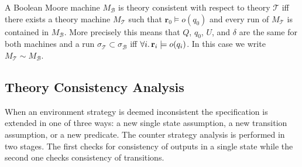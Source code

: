 \documentclass[runningheads]{llncs}
\newcommand{\globally}{\operatorname{\mathbf{G}}}
\newcommand{\lnext}{\operatorname{\mathbf{X}}}
\newcommand{\theory}{\mathcal{T}}
\newcommand{\bool}{\mathcal{B}}
\newcommand{\updf}{\mathbf{u}}
\newcommand{\rvar}{\mathbf{r}}
\newcommand{\ivar}{\mathbf{i}}
\newcommand{\sat}[1]{\texttt{sat}(#1)}
\newcommand{\consistent}{\textsc{consistent}}
\newcommand{\inconsistent}{\textsc{inconsistent}}
\begin{document}
A Boolean Moore machine $M_\bool$ is theory consistent with respect to theory $\theory$ iff there exists a theory machine $M_\theory$ such that $\rvar_0 \models o(q_0)$ and every run of $M_\theory$ is contained in $M_\bool$. More precisely this means that $Q$, $q_0$, $U$, and $\delta$ are the same for both machines and a run $\sigma_\theory \subset \sigma_\bool$ iff $\forall i \ldotp \rvar_i \models o(q_i)$.
In this case we write $M_\theory \sim M_\bool$.







\subsection{Theory Consistency Analysis}
When an environment strategy is deemed inconsistent the specification is extended in one of three ways: a new single state assumption, a new transition assumption, or a new predicate.
The counter strategy analysis is performed in two stages. The first checks for consistency of outputs in a single state while the second one checks consistency of transitions.





        
\end{document}
